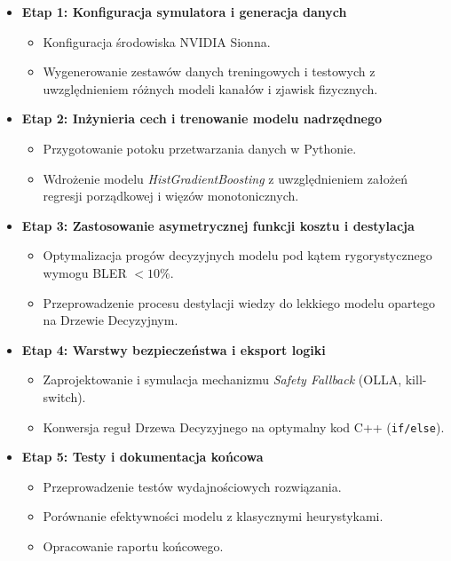 \documentclass[12pt, a4paper]{article}
\begin{document}
\begin{itemize}
    \item \textbf{Etap 1: Konfiguracja symulatora i generacja danych}
    \begin{itemize}
        \item Konfiguracja środowiska NVIDIA Sionna.
        \item Wygenerowanie zestawów danych treningowych i testowych z uwzględnieniem różnych modeli kanałów i zjawisk fizycznych.
    \end{itemize}
    
    \item \textbf{Etap 2: Inżynieria cech i trenowanie modelu nadrzędnego}
    \begin{itemize}
        \item Przygotowanie potoku przetwarzania danych w Pythonie.
        \item Wdrożenie modelu \textit{HistGradientBoosting} z uwzględnieniem założeń regresji porządkowej i więzów monotonicznych.
    \end{itemize}
    \newpage
    \item \textbf{Etap 3: Zastosowanie asymetrycznej funkcji kosztu i destylacja}
    \begin{itemize}
        \item Optymalizacja progów decyzyjnych modelu pod kątem rygorystycznego wymogu BLER $< 10\%$.
        \item Przeprowadzenie procesu destylacji wiedzy do lekkiego modelu opartego na Drzewie Decyzyjnym.
    \end{itemize}
    
    \item \textbf{Etap 4: Warstwy bezpieczeństwa i eksport logiki}
    \begin{itemize}
        \item Zaprojektowanie i symulacja mechanizmu \textit{Safety Fallback} (OLLA, kill-switch).
        \item Konwersja reguł Drzewa Decyzyjnego na optymalny kod C++ (\texttt{if/else}).
    \end{itemize}
    
    \item \textbf{Etap 5: Testy i dokumentacja końcowa}
    \begin{itemize}
        \item Przeprowadzenie testów wydajnościowych rozwiązania.
        \item Porównanie efektywności modelu z klasycznymi heurystykami.
        \item Opracowanie raportu końcowego.
    \end{itemize}
\end{itemize}
\end{document}
